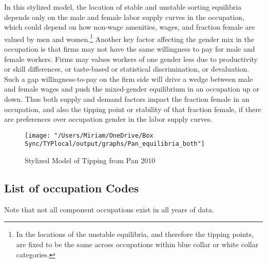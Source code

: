 \documentclass[12pt]{article}
\begin{document}

In this stylized model, the location of stable and unstable sorting equilibria depends only on the male and female labor supply curves in the occupation, which could depend on how non-wage amenities, wages, and fraction female are valued by men and women.\footnote{In  the locations of the unstable equilibria, and therefore the tipping points, are fixed to be the same across occupations within blue collar or white collar categories.} Another key factor affecting the gender mix in the occupation is that firms may not have the same willingness to pay for male and female workers. Firms may values workers of one gender less due to productivity or skill differences, or taste-based or statistical discrimination, or devaluation. Such a gap willingness-to-pay on the firm side will drive a wedge between male and female wages and push the mixed-gender equilibrium in an occupation up or down. Thus both supply and demand factors impact the fraction female in an occupation, and also the tipping point or stability of that fraction female, if there are preferences over occupation gender in the labor supply curves.

\begin{figure}[H]
\centering
\caption{Stylized Model of Tipping from Pan 2010}
\label{fig:tipping}
\texttt{[image: "/Users/Miriam/OneDrive/Box Sync/TYPlocal/output/graphs/Pan\_equilibria\_both"]}
\end{figure}


\subsection{List of occupation Codes} \label{occupations}

Note that not all component occupations exist in all years of data. 

%
\end{document}
